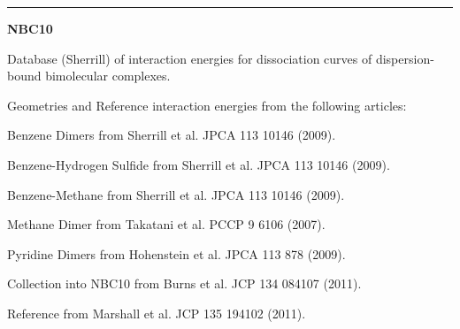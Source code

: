 \documentclass[letterpaper,10pt,english]{sphinxmanual}
\begin{document}
\bigskip\hrule{}\bigskip

\label{db:module-NBC10}
\textbf{NBC10}

\begin{DUlineblock}{0em}
\item[] Database (Sherrill) of interaction energies for dissociation curves of dispersion-bound bimolecular complexes.
\item[] Geometries and Reference interaction energies from the following articles:
\item[]
\begin{DUlineblock}{\DUlineblockindent}
\item[] Benzene Dimers from Sherrill et al. JPCA 113 10146 (2009).
\item[] Benzene-Hydrogen Sulfide from Sherrill et al. JPCA 113 10146 (2009).
\item[] Benzene-Methane from Sherrill et al. JPCA 113 10146 (2009).
\item[] Methane Dimer from Takatani et al. PCCP 9 6106 (2007).
\item[] Pyridine Dimers from Hohenstein et al. JPCA 113 878 (2009).
\item[] Collection into NBC10 from Burns et al. JCP 134 084107 (2011).
\item[] Reference from Marshall et al. JCP 135 194102 (2011).
\end{DUlineblock}
\end{DUlineblock}
\end{document}
